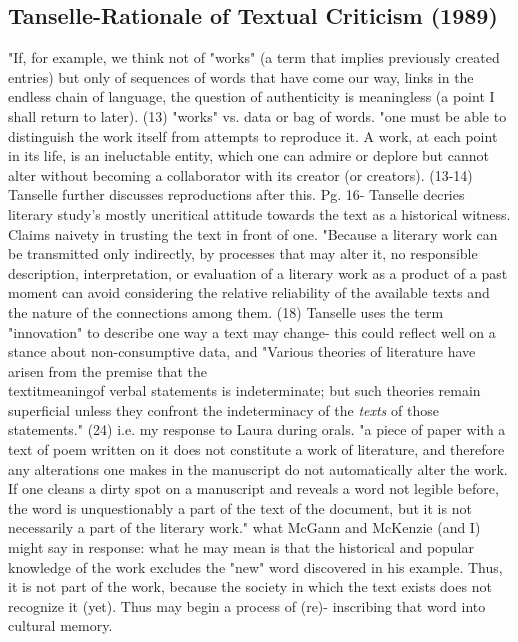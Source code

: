 \documentclass[course, english]{Notes}
\newcommand{\n}{\scalebox{2}{\textbf{\framebox{$\aleph$} } } }
\begin{document}
\subsection{Tanselle-Rationale of Textual Criticism (1989)}
\begin{outline}
\1 "If, for example, we think not of "works" (a term that implies previously created entries) but only of sequences of words that have come our way, links in the endless chain of language, the question of authenticity is meaningless (a point I shall return to later). (13)
	\2 \n "works" vs. data or bag of words.
\1 "one must be able to distinguish the work itself from attempts to reproduce it. A work, at each point in its life, is an ineluctable entity, which one can admire or deplore but cannot alter without becoming a collaborator with its creator (or creators). (13-14)
	\2 Tanselle further discusses reproductions after this.
\1 Pg. 16- Tanselle decries literary study's mostly uncritical attitude towards the text as a historical witness. Claims naivety in trusting the text in front of one. 
\1 "Because a literary work can be transmitted only indirectly, by processes that may alter it, no responsible description, interpretation, or evaluation of a literary work as a product of a past moment can avoid considering the relative reliability of the available texts and the nature of the connections among them. (18)
	\2 Tanselle uses the term "innovation" to describe one way a text may change- this could reflect well on a stance about non-consumptive data, and 
\1 "Various theories of literature have arisen from the premise that the \\textit{meaning}of verbal statements is indeterminate; but such theories remain superficial unless they confront the indeterminacy of the \textit{texts} of those statements." (24)
	\2 \n i.e. my response to Laura during orals. 
\1 "a piece of paper with a text of poem written on it does not constitute a work of literature, and therefore any alterations one makes in the manuscript do not automatically alter the work. If one cleans a dirty spot on a manuscript and reveals a word not legible before, the word is unquestionably a part of the text of the document, but it is not necessarily a part of the literary work."
	\2  \n what McGann and McKenzie (and I) might say in response: what he may mean is that the historical and popular knowledge of the work excludes the "new" word discovered in his example. Thus, it is not part of the work, because the society in which the text exists does not recognize it (yet). Thus may begin a process of (re)- inscribing that word into cultural memory. 

\end{outline}
\end{document}
